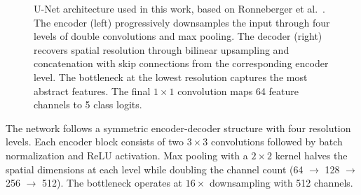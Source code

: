 \documentclass[12pt,a4paper]{article}
\begin{document}
\begin{figure}[H]
\caption{U-Net architecture used in this work, based on Ronneberger et al.~\cite{ronneberger2015}. The encoder (left) progressively downsamples the input through four levels of double convolutions and max pooling. The decoder (right) recovers spatial resolution through bilinear upsampling and concatenation with skip connections from the corresponding encoder level. The bottleneck at the lowest resolution captures the most abstract features. The final $1 \times 1$ convolution maps 64 feature channels to 5 class logits.}
\label{fig:unet}
\end{figure}

The network follows a symmetric encoder-decoder structure with four resolution levels. Each encoder block consists of two $3 \times 3$ convolutions followed by batch normalization and ReLU activation. Max pooling with a $2 \times 2$ kernel halves the spatial dimensions at each level while doubling the channel count (64 $\rightarrow$ 128 $\rightarrow$ 256 $\rightarrow$ 512). The bottleneck operates at $16 \times$ downsampling with 512 channels.
\end{document}
